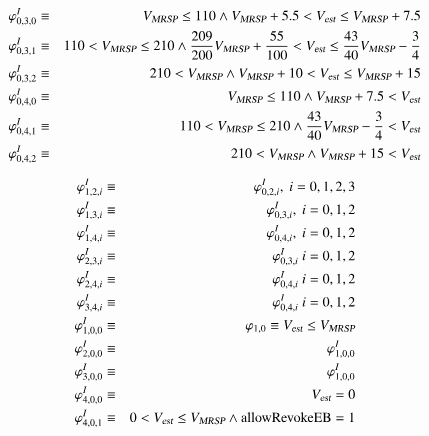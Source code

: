 \begin{example}
\begin{eqnarray*}
\\
\varphi_{0,3,0}^I &\equiv& {V_{\text{\sl MRSP}}} \le 110 \wedge {V_{\text{\sl MRSP}}} + 5.5 < {V_{\text{\sl est}}} \le  {V_{\text{\sl MRSP}}} + 7.5
\\
\varphi_{0,3,1}^I &\equiv& 110<{V_{\text{\sl MRSP}}} \le 210 \wedge \frac{209}{200}{V_{\text{\sl MRSP}}} +\frac{55}{100}< {V_{\text{\sl est}}} \le  \frac{43}{40}{V_{\text{\sl MRSP}}} -\frac{3}{4}
\\
\varphi_{0,3,2}^I &\equiv& 210<{V_{\text{\sl MRSP}}}   \wedge {V_{\text{\sl MRSP}}} +10 < {V_{\text{\sl est}}} \le  {V_{\text{\sl MRSP}}} +15
\\
\varphi_{0,4,0}^I &\equiv& {V_{\text{\sl MRSP}}} \le 110 \wedge {V_{\text{\sl MRSP}}} + 7.5 < {V_{\text{\sl est}}}
\\
\varphi_{0,4,1}^I &\equiv& 110<{V_{\text{\sl MRSP}}} \le 210 \wedge  \frac{43}{40}{V_{\text{\sl MRSP}}} -\frac{3}{4}< {V_{\text{\sl est}}}
\\
\varphi_{0,4,2}^I &\equiv& 210<{V_{\text{\sl MRSP}}}   \wedge {V_{\text{\sl MRSP}}} +15 < {V_{\text{\sl est}}}
\end{eqnarray*}

\begin{eqnarray*}
\varphi_{1,2,i}^I &\equiv& \varphi_{0,2,i}^I, \ i = 0,1,2,3
\\  
\varphi_{1,3,i}^I &\equiv& \varphi_{0,3,i}^I, \ i = 0,1,2
\\
\varphi_{1,4,i}^I &\equiv& \varphi_{0,4,i}^I, \ i = 0,1,2
\\
\varphi_{2,3,i}^I &\equiv& \varphi_{0,3,i}^I \ i = 0,1,2
\\ 
\varphi_{2,4,i}^I &\equiv& \varphi_{0,4,i}^I \ i = 0,1,2
\\
\varphi_{3,4,i}^I &\equiv& \varphi_{0,4,i}^I \ i = 0,1,2
\\
\varphi_{1,0,0}^I &\equiv& \varphi_{1,0} \equiv {V_{\text{\sl est}}} \le {V_{\text{\sl MRSP}}}  
\\
\varphi_{2,0,0}^I &\equiv& \varphi_{1,0,0}^I  
\\
\varphi_{3,0,0}^I &\equiv& \varphi_{1,0,0}^I  
\\
\varphi_{4,0,0}^I &\equiv& {V_{\text{\sl est}}} = 0 
\\
\varphi_{4,0,1}^I &\equiv& 0 < {V_{\text{\sl est}}} \le {V_{\text{\sl MRSP}}} \wedge \text{allowRevokeEB} = 1
\end{eqnarray*}


\end{example}
